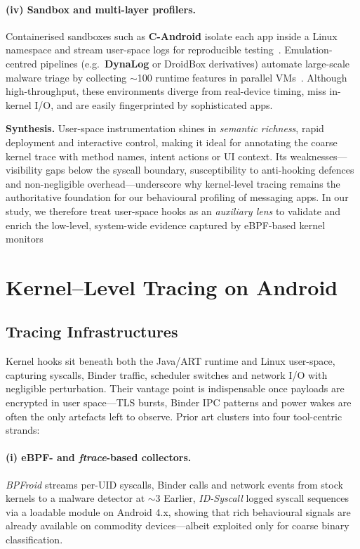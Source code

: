 \documentclass[a4paper,12pt]{report}
\begin{document}
\paragraph{(iv) Sandbox and multi-layer profilers.}
Containerised sandboxes such as \textbf{C-Android} isolate each app inside a
Linux namespace and stream user-space logs for reproducible
testing~\cite{candroid2019}.  Emulation-centred pipelines (e.g.\ \textbf{DynaLog}
or DroidBox derivatives) automate large-scale malware triage by collecting
$\sim$100 runtime features in parallel VMs~\cite{dynalog2016}.  Although
high-throughput, these environments diverge from real-device timing,
miss in-kernel I/O, and are easily fingerprinted by sophisticated apps.

\medskip
\noindent\textbf{Synthesis.}
User-space instrumentation shines in \emph{semantic richness}, rapid
deployment and interactive control, making it ideal for annotating the coarse
kernel trace with method names, intent actions or UI context.  Its
weaknesses—visibility gaps below the syscall boundary, susceptibility to
anti-hooking defences and non-negligible overhead—underscore why kernel-level
tracing remains the authoritative foundation for our behavioural profiling of
messaging apps.  In our study, we therefore treat user-space hooks as an
\emph{auxiliary lens} to validate and enrich the low-level, system-wide evidence
captured by eBPF-based kernel monitors



\section{Kernel–Level Tracing on Android}

\subsection{Tracing Infrastructures}
Kernel hooks sit beneath both the Java/ART runtime and Linux user-space, capturing syscalls, Binder traffic, scheduler switches and network I/O with negligible perturbation.  Their vantage point is indispensable once payloads are encrypted in user space—TLS bursts, Binder IPC patterns and power wakes are often the only artefacts left to observe.  Prior art clusters into four tool-centric strands:

\paragraph{(i) eBPF- and \textit{ftrace}-based collectors.}
\emph{BPFroid} streams per-UID syscalls, Binder calls and network events from stock kernels to a malware detector at $\sim$3 %
Earlier, \emph{ID-Syscall} logged syscall sequences via a loadable module on Android 4.x, showing that rich behavioural signals are already available on commodity devices—albeit exploited only for coarse binary classification.
\end{document}
